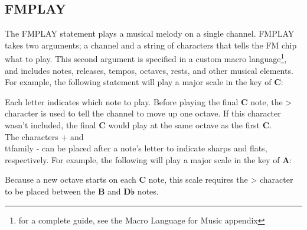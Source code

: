 \subsection{FMPLAY}

The {\ttfamily FMPLAY} statement plays a musical melody on a single channel.
{\ttfamily FMPLAY} takes two arguments; a channel and a string of characters
that tells the FM chip what to play.  This second argument is specified in a
custom macro language\footnote{for a complete guide, see the Macro Language for
Music appendix}, and includes notes, releases, tempos, octaves, rests, and
other musical elements.  For example, the following statement will play a major
scale in the key of {\ttfamily\bfseries C}:\\


Each letter indicates which note to play.  Before playing the final
{\ttfamily\bfseries C} note, the {\ttfamily >} character is used to tell the
channel to move up one octave.  If this character wasn't included, the final
{\ttfamily\bfseries C} would play at the same octave as the first
{\ttfamily\bfseries C}.\\

The characters {\ttfamily +} and {\\ttfamily -} can be placed after a note's
letter to indicate sharps and flats, respectively.  For example, the following
will play a major scale in the key of {\ttfamily\bfseries A}:\\


Because a new octave starts on each {\ttfamily\bfseries C} note, this scale
requires the {\ttfamily >} character to be placed between the
{\ttfamily\bfseries B} and {\ttfamily\bfseries D♭} notes.\\

